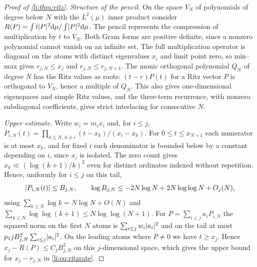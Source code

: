 \begin{proof}[Proof of \cref{li:thm:ritz}]
\emph{Structure of the pencil.} On the space $V_N$ of polynomials of degree below $N$ with the
$L^2(\mu)$ inner product consider $R(P)=\int t\lvert P\rvert^2\mathrm{d}\mu/\int\lvert P\rvert^2\mathrm{d}\mu$. The pencil
represents the compression of multiplication by $t$ to $V_N$. Both Gram forms are positive definite,
since a nonzero polynomial cannot vanish on an infinite set. The full multiplication operator is
diagonal on the atoms with distinct eigenvalues $x_i$ and limit point zero, so min--max gives
$r_{j,N}\le x_j$ and $r_{j,N}\le r_{j,N+1}$. The monic orthogonal polynomial $Q_N$ of degree $N$
has the Ritz values as roots: $(t-r)P(t)$ for a Ritz vector $P$ is orthogonal to $V_N$, hence a
multiple of $Q_N$. This also gives one-dimensional eigenspaces and simple Ritz values, and the
three-term recurrence, with nonzero subdiagonal coefficients, gives strict interlacing for
consecutive $N$.

\emph{Upper estimate.} Write $w_i=m_ix_i$ and, for $i\le j$,
$P_{i,N}(t)=\prod_{k\le N,\,k\ne i}(t-x_k)/(x_i-x_k)$. For $0\le t\le x_{N+1}$ each numerator is
at most $x_k$, and for fixed $i$ each denominator is bounded below by a constant depending on $i$,
since $x_i$ is isolated. The zero count gives $x_k\ll(\log(k+1)/k)^2$ even for distinct ordinates
indexed without repetition. Hence, uniformly for $i\le j$ on this tail,
\begin{equation}\label{li:eq:ritzB}
 \lvert P_{i,N}(t)\rvert\le B_{j,N},\qquad\log B_{j,N}\le-2N\log N+2N\log\log N+O_j(N),
\end{equation}
using $\sum_{k\le N}\log k=N\log N+O(N)$ and $\sum_{k\le N}\log\log(k+1)\le N\log\log(N+1)$. For
$P=\sum_{i\le j}a_iP_{i,N}$ the squared norm on the first $N$ atoms is $\sum_{i\le j}w_i\lvert a_i\rvert^2$
and on the tail at most $p_1jB_{j,N}^2\sum_{i\le j}\lvert a_i\rvert^2$. On the leading atoms where $P\ne0$
we have $t\ge x_j$. Hence $x_j-R(P)\le C_jB_{j,N}^2$ on this $j$-dimensional space, which gives the
upper bound for $x_j-r_{j,N}$ in \eqref{li:eq:ritzrate}.


\end{proof}
